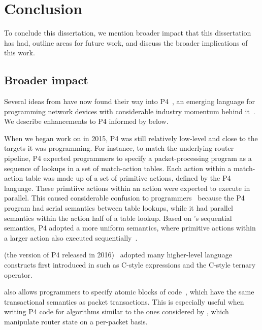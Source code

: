 \chapter{Conclusion}
\label{chap:concl}

To conclude this dissertation, we mention broader impact that this dissertation
has had, outline areas for future work, and discuss the broader implications of
this work.

\section{Broader impact}
\label{s:impact}
Several ideas from \pktlanguage have now found their way into P4~\cite{p4}, an
emerging language for programming network devices with considerable industry
momentum behind it~\cite{p4org}. We describe enhancements to P4 informed by
\pktlanguage below.
\begin{CompactEnumerate}
\item When we began work on \pktlanguage in 2015, P4 was still relatively
low-level and close to the targets it was programming. For instance, to match
the underlying router pipeline, P4 expected programmers to specify a
packet-processing program as a sequence of lookups in a set of match-action
tables. Each action within a match-action table was made up of a set of
primitive actions, defined by the P4 language. These primtiive actions within
an action were expected to execute in parallel. This caused considerable
confusion to programmers~\cite{p4-semantics} because the P4 program had serial
semantics between table lookups, while it had parallel semantics within the
action half of a table lookup. Based on \pktlanguage's sequential semantics, P4
adopted a more uniform semantics, where primitive actions within a larger
action also executed sequentially~\cite{p4_sequential_pr, p4_sequential_issue}.
\item \pfs (the version of P4 released in 2016)~\cite{p4_16} adopted many
higher-level language constructs first introduced in \pktlanguage such as
C-style expressions and the C-style ternary operator.
\item \pfs also allows programmers to specify atomic blocks of
code~\cite{p4_atomic_pr, p4_atomic_issue}, which have the same transactional
semantics as packet transactions. This is especially useful when writing P4
code for algorithms similar to the ones considered by \pktlanguage, which
manipulate router state on a per-packet basis.
\end{CompactEnumerate}

